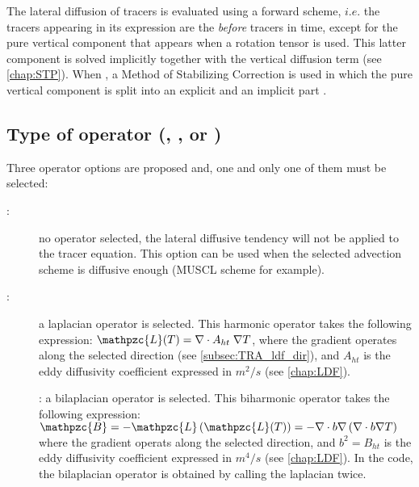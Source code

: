 \documentclass[../main/NEMO_manual]{subfiles}
\begin{document}
The lateral diffusion of tracers is evaluated using a forward scheme,
$i.e.$ the tracers appearing in its expression are the \textit{before} tracers in time,
except for the pure vertical component that appears when a rotation tensor is used.
This latter component is solved implicitly together with the vertical diffusion term (see \autoref{chap:STP}).
When , a Method of Stabilizing Correction is used in which
the pure vertical component is split into an explicit and an implicit part \citep{Lemarie_OM2012}.

\subsection[Type of operator (\protect\np{ln\_traldf}\{\_NONE,\_lap,\_blp\}\})]
			     {Type of operator (\protect{}, \protect{}, or \protect{}) } 
\label{subsec:TRA_ldf_op}

Three operator options are proposed and, one and only one of them must be selected:
\begin{description}
\item[:]
  no operator selected, the lateral diffusive tendency will not be applied to the tracer equation.
  This option can be used when the selected advection scheme is diffusive enough (MUSCL scheme for example).
\item[:]
  a laplacian operator is selected.
  This harmonic operator takes the following expression:  $\mathpzc{L}(T)=\nabla \cdot A_{ht}\;\nabla T $,
  where the gradient operates along the selected direction (see \autoref{subsec:TRA_ldf_dir}),
  and $A_{ht}$ is the eddy diffusivity coefficient expressed in $m^2/s$ (see \autoref{chap:LDF}).
\item[]:
  a bilaplacian operator is selected.
  This biharmonic operator takes the following expression:
  $\mathpzc{B}=- \mathpzc{L}\left(\mathpzc{L}(T) \right) = -\nabla \cdot b\nabla \left( {\nabla \cdot b\nabla T} \right)$
  where the gradient operats along the selected direction,
  and $b^2=B_{ht}$ is the eddy diffusivity coefficient expressed in $m^4/s$  (see \autoref{chap:LDF}).
  In the code, the bilaplacian operator is obtained by calling the laplacian twice.
\end{description}
\end{document}
